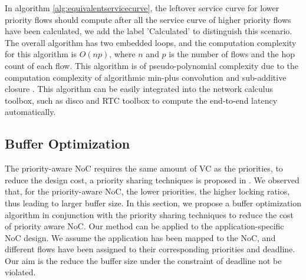 \documentclass[10pt,journal]{IEEEtran}
\begin{document}
In algorithm \ref{alg:equivalentservicecurve}, the leftover service curve for lower priority flows should compute after all the service curve of higher priority flows have been calculated, we add the label 'Calculated' to distinguish this scenario. The overall algorithm has two embedded loops, and the computation complexity for this algorithm is $O(np)$, where $n$ and $p$ is the number of flows and the hop count of each flow. This algorithm is of pseudo-polynomial complexity due to the computation complexity of algorithmic min-plus convolution and sub-additive closure \cite{Bouillard2008}. This algorithm can be easily integrated into the network calculus toolbox, such as disco\cite{5755058} and RTC toolbox\cite{rtc} to compute the end-to-end latency automatically.

\subsection{Buffer Optimization}
The priority-aware NoC requires the same amount of VC as the priorities, to reduce the design cost, a priority sharing techniques is proposed in \cite{5161497}. We observed that, for the priority-aware NoC, the lower priorities, the higher locking ratios, thus leading to larger buffer size. In this section, we propose a buffer optimization algorithm in conjunction with the priority sharing techniques to reduce the cost of priority aware NoC. Our method can be applied to the application-specific NoC design. We assume the application has been mapped to the NoC, and different flows have been assigned to their corresponding priorities and deadline. Our aim is the reduce the buffer size under the constraint of deadline not be violated.
\end{document}
